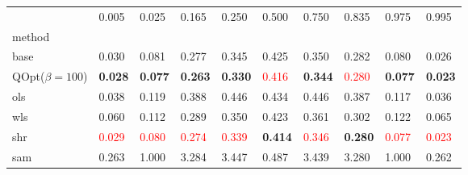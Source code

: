 \begin{tabular}{llllllllll}
\toprule
 & 0.005 & 0.025 & 0.165 & 0.250 & 0.500 & 0.750 & 0.835 & 0.975 & 0.995 \\
method &  &  &  &  &  &  &  &  &  \\
\midrule
base & 0.030 & 0.081 & 0.277 & 0.345 & 0.425 & 0.350 & 0.282 & 0.080 & 0.026 \\
\midrule
QOpt($\beta=100$) & \textbf{0.028} & \textbf{0.077} & \textbf{0.263} & \textbf{0.330} & \textcolor{red}{0.416} & \textbf{0.344} & \textcolor{red}{0.280} & \textbf{0.077} & \textbf{0.023} \\
ols & 0.038 & 0.119 & 0.388 & 0.446 & 0.434 & 0.446 & 0.387 & 0.117 & 0.036 \\
wls & 0.060 & 0.112 & 0.289 & 0.350 & 0.423 & 0.361 & 0.302 & 0.122 & 0.065 \\
shr & \textcolor{red}{0.029} & \textcolor{red}{0.080} & \textcolor{red}{0.274} & \textcolor{red}{0.339} & \textbf{0.414} & \textcolor{red}{0.346} & \textbf{0.280} & \textcolor{red}{0.077} & \textcolor{red}{0.023} \\
sam & 0.263 & 1.000 & 3.284 & 3.447 & 0.487 & 3.439 & 3.280 & 1.000 & 0.262 \\
\bottomrule
\end{tabular}